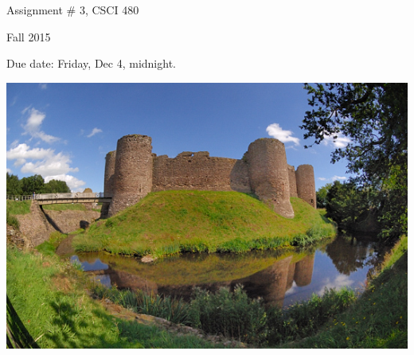 \documentclass{article}
\begin{document}
\begin{multicols}{2}
  \centerline{\LARGE Assignment \# 3, CSCI 480}

  \centerline{\Large Fall 2015}

\centerline{\large Due date: Friday, Dec 4, midnight.}

\columnbreak
\centerline{\includegraphics[scale=1.5]{whitecastlereflected.jpg}}
\end{multicols}
\end{document}
